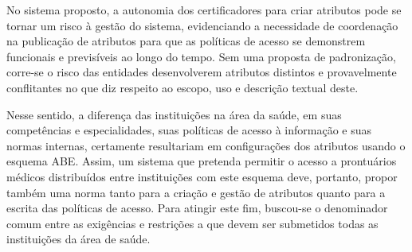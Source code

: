 \documentclass[a4paper,11pt]{article}
\begin{document}


No sistema proposto, a autonomia dos certificadores para criar atributos pode se tornar um risco à gestão do sistema, evidenciando a necessidade de coordenação na publicação de atributos para que as políticas de acesso se demonstrem funcionais e previsíveis ao longo do tempo. %
Sem uma proposta de padronização, corre-se o risco das entidades desenvolverem atributos distintos e provavelmente conflitantes no que diz respeito ao escopo, uso e descrição textual deste.

Nesse sentido, a diferença das instituições na área da saúde, em suas competências e especialidades,  suas políticas de acesso à informação e suas normas internas, certamente resultariam em configurações dos atributos usando o esquema ABE.
Assim, um sistema que pretenda permitir o acesso a prontuários médicos distribuídos entre instituições com este esquema deve, portanto, propor também uma norma tanto para a criação e gestão de atributos quanto para a escrita das políticas de acesso.
Para atingir este fim, buscou-se o denominador comum entre as exigências e restrições a que devem ser submetidos todas as instituições da área de saúde.
\end{document}
